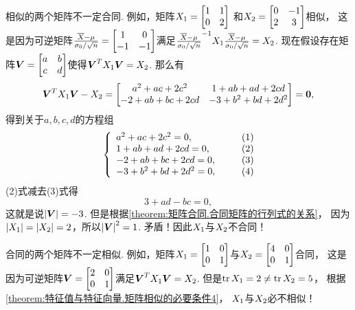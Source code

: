 \begin{example}
相似的两个矩阵不一定合同.
例如，矩阵\(X_1=\begin{bmatrix}
	1 & 1 \\
	0 & 2
\end{bmatrix}\)
和\(X_2=\begin{bmatrix}
	0 & -1 \\
	2 & 3
\end{bmatrix}\)相似，
这是因为可逆矩阵\(\P=\begin{bmatrix}
	1 & 0 \\
	-1 & -1
\end{bmatrix}\)满足\(\P^{-1}\A\P=\B\).
现在假设存在矩阵\(\Q=\begin{bmatrix}
	a & b \\
	c & d
\end{bmatrix}\)使得\(\Q^T\A\Q=\B\).
那么有\[
	\Q^T\A\Q-\B
	=\begin{bmatrix}
		a^2+ac+2c^2 & 1+ab+ad+2cd \\
		-2+ab+bc+2cd & -3+b^2+bd+2d^2
	\end{bmatrix}
	=\vb0,
\]
得到关于\(a,b,c,d\)的方程组
\begin{align*}
	\left\{ \begin{array}{l}
		a^2+ac+2c^2 = 0, \\
		1+ab+ad+2cd = 0, \\
		-2+ab+bc+2cd = 0, \\
		-3+b^2+bd+2d^2 = 0,
	\end{array} \right.
	\tag*{$\begin{matrix}(1)\\(2)\\(3)\\(4)\end{matrix}$}
\end{align*}
(2)式减去(3)式得\[
	3+ad-bc=0,
\]
这就是说\(\abs{\Q}=-3\).
但是根据\cref{theorem:矩阵合同.合同矩阵的行列式的关系}，
因为\(\abs{X_1}=\abs{X_2}=2\)，所以\(\abs{\Q}^2=1\).
矛盾！因此\(X_1\)与\(X_2\)不合同！
\end{example}

\begin{example}\label{example:矩阵合同.合同矩阵不一定相似}
合同的两个矩阵不一定相似.
例如，矩阵\(X_1=\begin{bmatrix}
	1 & 0 \\
	0 & 1
\end{bmatrix}\)与\(X_2=\begin{bmatrix}
	4 & 0 \\
	0 & 1
\end{bmatrix}\)合同，
这是因为可逆矩阵\(\Q=\begin{bmatrix}
	2 & 0 \\
	0 & 1
\end{bmatrix}\)满足\(\Q^T\A\Q=\B\).
但是\(\tr X_1=2 \neq \tr X_2 = 5\)，
根据\cref{theorem:特征值与特征向量.矩阵相似的必要条件4}，
\(X_1\)与\(X_2\)必不相似！
\end{example}

